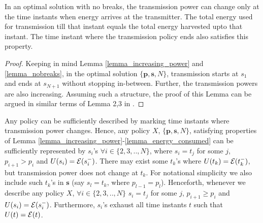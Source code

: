 %
%

\begin{lemma}
In an optimal solution with no breaks, the transmission power can change only at the time instants when energy arrives at the transmitter. The total energy used for transmission till that instant equals the total energy harvested upto that instant. The time instant where the transmission policy ends also satisfies this property.
\label{lemma_energy_consumed} 
\end{lemma}
\begin{proof}
Keeping in mind Lemma \ref{lemma_increasing_power} and \ref{lemma_nobreaks}, in the optimal solution $\{\bm{p}, \bm{s}, N\}$, transmission starts at $s_1$ and ends at $s_{N+1}$ without stopping in-between. Further, the transmission powers are also increasing. Assuming such a structure, the proof of this Lemma can be argued in similar terms of Lemma 2,3 in \cite{Yang}. 
\end{proof}	

Any policy can be sufficiently described by marking time instants where transmission power changes. Hence, any policy $X$, $\{\bm{p},\bm{s},N\}$, satisfying properties of Lemma \ref{lemma_increasing_power}-\ref{lemma_energy_consumed} can be sufficiently represented by $s_i$'s $\forall i\in\{2,3,..,N\}$, where $s_i=t_j$ for some $j$, $p_{i+1}>p_i$ and $U(s_i)=\mathcal{E}(s_i^-)$. There may exist some $t_k$'s where $U(t_k)=\mathcal{E}(t_k^-)$, but transmission power does not change at $t_k$. For notational simplicity we also include such $t_k$'s in $\bm{s}$ (say $s_l=t_k$, where $p_{l-1}=p_l$). Henceforth, whenever we describe any policy $X$, $\forall i\in\{2,3,..,N\}$ $s_i=t_j$ for some $j$, $p_{i+1}\ge p_i$ and $U(s_i)=\mathcal{E}(s_i^-)$. Furthermore, $s_i$'s exhaust all time instants $t$ such that $U(t)= \mathcal{E}(t)$.
  
